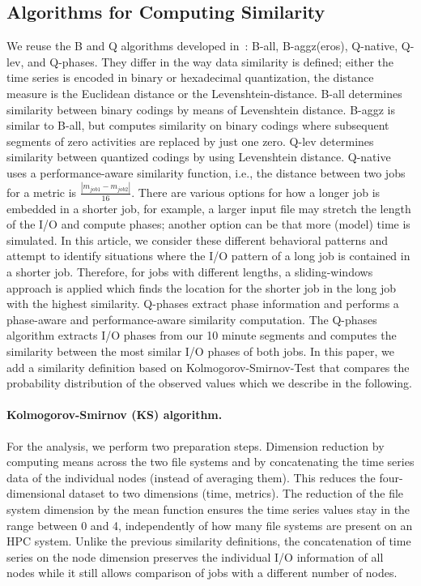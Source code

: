 \documentclass{jhps}
\begin{document}
\subsection{Algorithms for Computing Similarity}
We reuse the B and Q algorithms developed in~\cite{Eugen20HPS}: B-all, B-aggz(eros), Q-native, Q-lev, and Q-phases.
They differ in the way data similarity is defined; either the time series is encoded in binary or hexadecimal quantization, the distance measure is the Euclidean distance or the Levenshtein-distance.
B-all determines similarity between binary codings by means of Levenshtein distance.
B-aggz is similar to B-all, but computes similarity on binary codings where subsequent segments of zero activities are replaced by just one zero.
Q-lev determines similarity between quantized codings by using Levenshtein distance.
Q-native uses a performance-aware similarity function, i.e., the distance between two jobs for a metric is $\frac{|m_{job1} - m_{job2}|}{16}$.
There are various options for how a longer job is embedded in a shorter job, for example, a larger input file may stretch the length of the I/O and compute phases; another option can be that more (model) time is simulated. In this article, we consider these different behavioral patterns and attempt to identify situations where the I/O pattern of a long job is contained in a shorter job. Therefore, for jobs with different lengths, a sliding-windows approach is applied which finds the location for the shorter job in the long job with the highest similarity.
Q-phases extract phase information and performs a phase-aware and performance-aware similarity computation.
The Q-phases algorithm extracts I/O phases from our 10 minute segments and computes the similarity between the most similar I/O phases of both jobs.
In this paper, we add a similarity definition based on Kolmogorov-Smirnov-Test that compares the probability distribution of the observed values which we describe in the following.

\paragraph{Kolmogorov-Smirnov (KS) algorithm.}
For the analysis, we perform two preparation steps.
Dimension reduction by computing means across the two file systems and by concatenating the time series data of the individual nodes (instead of averaging them).
This reduces the four-dimensional dataset to two dimensions (time, metrics).
The reduction of the file system dimension by the mean function ensures the time series values stay in the range between 0 and 4, independently of how many file systems are present on an HPC system.
Unlike the previous similarity definitions, the concatenation of time series on the node dimension preserves the individual I/O information of all nodes while it still allows comparison of jobs with a different number of nodes.
\end{document}
